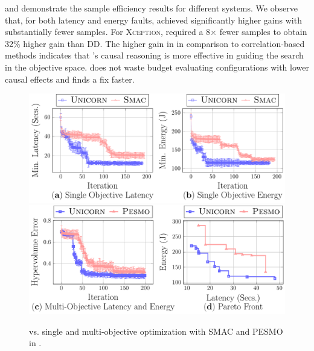  and  demonstrate the sample efficiency results for different systems. We observe that, for both latency and energy faults, \ourapproach achieved significantly higher gains with substantially fewer samples. For \textsc{Xception}, \ourapproach required a 8$\times$ fewer samples to obtain 32\% higher gain than \textsc{DD}. The higher gain in \ourapproach in comparison to correlation-based methods indicates that \ourapproach's causal reasoning is more effective in guiding the search in the objective space. \ourapproach does not waste budget evaluating configurations with lower causal effects and finds a fix faster.

\begin{figure}[tp!]
  
    \includegraphics[width=\linewidth]{figures-vg/sobo_opt_tx2.pdf} 
    \includegraphics[width=\linewidth]{figures-vg/mobo_opt_tx2.pdf}
    \vspace{-4mm}
    \caption{\small{\ourapproach vs. single and multi-objective optimization with SMAC and PESMO in \txtwo.}}%
     \label{fig:rq1_opt_se}
    \vspace{-3mm}
\end{figure}

